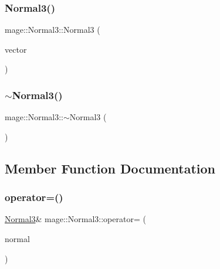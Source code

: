 \hypertarget{structmage_1_1_normal3_a36d104fdbec6251dd2ac44ea77f93c0f}{}\label{structmage_1_1_normal3_a36d104fdbec6251dd2ac44ea77f93c0f} 
\subsubsection{\texorpdfstring{Normal3()}{Normal3()}\hspace{0.1cm}{\footnotesize\ttfamily [10/10]}}
{\footnotesize\ttfamily mage\+::\+Normal3\+::\+Normal3 (\begin{DoxyParamCaption}\item[{X\+M\+F\+L\+O\+A\+T3 \&\&}]{vector }\end{DoxyParamCaption})\hspace{0.3cm}{\ttfamily [explicit]}}

\hypertarget{structmage_1_1_normal3_a3384b2970fd85fe729514ce0686b4446}{}\label{structmage_1_1_normal3_a3384b2970fd85fe729514ce0686b4446} 
\subsubsection{\texorpdfstring{$\sim$\+Normal3()}{~Normal3()}}
{\footnotesize\ttfamily mage\+::\+Normal3\+::$\sim$\+Normal3 (\begin{DoxyParamCaption}{ }\end{DoxyParamCaption})\hspace{0.3cm}{\ttfamily [default]}}



\subsection{Member Function Documentation}
\hypertarget{structmage_1_1_normal3_ade86357989ceaecf1b22bb9e53ca7fed}{}\label{structmage_1_1_normal3_ade86357989ceaecf1b22bb9e53ca7fed} 
\subsubsection{\texorpdfstring{operator=()}{operator=()}\hspace{0.1cm}{\footnotesize\ttfamily [1/2]}}
{\footnotesize\ttfamily \hyperlink{structmage_1_1_normal3}{Normal3}\& mage\+::\+Normal3\+::operator= (\begin{DoxyParamCaption}\item[{const \hyperlink{structmage_1_1_normal3}{Normal3} \&}]{normal }\end{DoxyParamCaption})}

